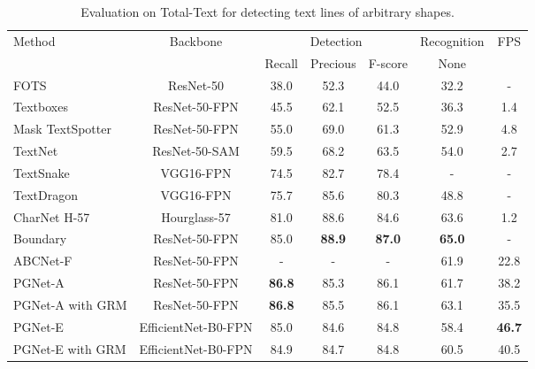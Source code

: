 \documentclass[letterpaper]{article} \usepackage{aaai21}  \usepackage{times}  \usepackage{helvet} \usepackage{courier}  \usepackage[hyphens]{url}  \usepackage{graphicx} \urlstyle{rm} \def\UrlFont{\rm}  \usepackage{natbib}  \usepackage{caption} \usepackage{bm}
\begin{document}
\begin{table*}
    \centering
    \begin{tabular}{l|c|c|c|c|c|c}
        \hline
        \multirow{2}{*}{Method} &\multirow{2}{*}{Backbone}  & \multicolumn{3}{c|}{Detection} & \multicolumn{1}{c|}{Recognition} & \multirow{2}{*}{FPS} \\ \cline{3-6}
        & & Recall  & Precious  & F-score  & None                         &                      \\ 
        \hline
FOTS~\cite{liu2018fots}                 &ResNet-50          &38.0 &52.3 &44.0 &32.2    &-\\
        Textboxes~\cite{liao2017textboxes}      &ResNet-50-FPN      &45.5 &62.1 &52.5 &36.3    &1.4\\
        Mask TextSpotter~\cite{yao2018mask}     &ResNet-50-FPN      &55.0 &69.0 &61.3 &52.9    &4.8\\
        TextNet~\cite{sun2018textnet}           &ResNet-50-SAM      &59.5 &68.2 &63.5 &54.0   &2.7\\
        TextSnake~\cite{long2018textsnake}      &VGG16-FPN          &74.5 &82.7 &78.4 &-      &-\\
TextDragon~\cite{feng2019textdragon}    &VGG16-FPN          &75.7 &85.6 &80.3 &48.8   &-\\
        CharNet H-57~\cite{xing2019convolutional}&Hourglass-57      &81.0 &88.6 &84.6 &63.6   &1.2\\
        Boundary~\cite{wang2020all}    &ResNet-50-FPN      &85.0 &\textbf{88.9} &\textbf{87.0} &\textbf{65.0}  &- \\
        ABCNet-F~\cite{liu2020abcnet}           &ResNet-50-FPN      &-    &-    &-    &61.9   &22.8\\
        \hline
        PGNet-A             &ResNet-50-FPN          & \textbf{86.8} &85.3 & 86.1 & 61.7  &38.2\\
        PGNet-A with GRM    &ResNet-50-FPN          & \textbf{86.8} &85.5 & 86.1 & 63.1  &35.5\\
        PGNet-E             &EfficientNet-B0-FPN    & 85.0 & 84.6 & 84.8 & 58.4 &\textbf{46.7}\\
        PGNet-E with GRM    &EfficientNet-B0-FPN    & 84.9 & 84.7 & 84.8 & 60.5 &40.5\\
        \hline
    \end{tabular}
    \caption{Evaluation on Total-Text for detecting text lines of arbitrary shapes.}
    \label{tab:tt}
\end{table*}
\end{document}

